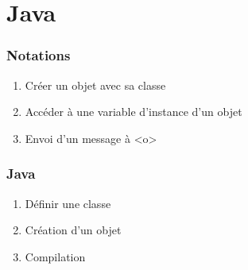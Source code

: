 \documentclass{article}
\begin{document}
\newpage
\part{Java}
\section{Notations}
\begin{enumerate}
\item Créer un objet avec sa classe
\item Accéder à une variable d'instance d'un objet
\item Envoi d'un message à <o>
\end{enumerate}
\section{Java}
\begin{enumerate}
\item Définir une classe
\item Création d'un objet
\item Compilation
\end{enumerate}
\end{document}
